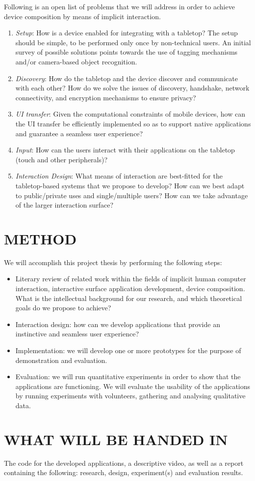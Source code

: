 Following is an open list of problems that we will address in order to achieve device composition by means of implicit interaction.
\begin{enumerate}
\item{\emph{Setup}: How is a device enabled for integrating with a tabletop?
The setup should be simple, to be performed only once by non-technical users.
An initial survey of possible solutions points towards the use of tagging mechanisms and/or camera-based object recognition.}
\item{\emph{Discovery}: How do the tabletop and the device discover and communicate with each other?
How do we solve the issues of discovery, handshake, network connectivity, and encryption mechanisms to ensure privacy?}
\item{\emph{UI transfer}: Given the computational constraints of mobile devices, how can the UI transfer be efficiently implemented so as to support native applications and guarantee a seamless user experience?}
\item{\emph{Input}: How can the users interact with their applications on the tabletop (touch and other peripherals)?}
\item{\emph{Interaction Design}: What means of interaction are best-fitted for the tabletop-based systems that we propose to develop?
How can we best adapt to public/private uses and single/multiple users?
How can we take advantage of the larger interaction surface?}
\end{enumerate}

\section{METHOD}

We will accomplish this project thesis by performing the following steps:
\begin{itemize}
\item{Literary review of related work within the fields of implicit human computer interaction, interactive surface application development, device composition. What is the intellectual background for our research, and which theoretical goals do we propose to achieve?}
\item{Interaction design: how can we develop applications that provide an instinctive and seamless user experience?}
\item{Implementation: we will develop one or more prototypes for the purpose of demonstration and evaluation.}
\item{Evaluation: we will run quantitative experiments in order to show that the applications are functioning. We will evaluate the usability of the applications by running experiments with volunteers, gathering and analysing qualitative data.}
\end{itemize}

\section{WHAT WILL BE HANDED IN}

The code for the developed applications, a descriptive video, as well as a report containing the following: research, design, experiment(s) and evaluation results.